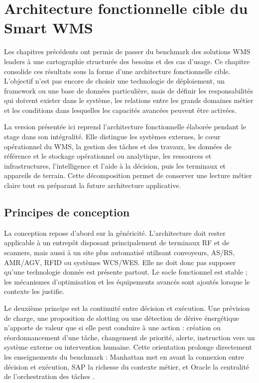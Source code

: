 \chapter{Architecture fonctionnelle cible du Smart WMS}

\label{chap:4}

Les chapitres précédents ont permis de passer du benchmark des solutions WMS leaders à une cartographie structurée des besoins et des cas d’usage. Ce chapitre consolide ces résultats sous la forme d’une architecture fonctionnelle cible. L’objectif n’est pas encore de choisir une technologie de déploiement, un framework ou une base de données particulière, mais de définir les responsabilités qui doivent exister dans le système, les relations entre les grands domaines métier et les conditions dans lesquelles les capacités avancées peuvent être activées.


La version présentée ici reprend l’architecture fonctionnelle élaborée pendant le stage dans son intégralité. Elle distingue les systèmes externes, le cœur opérationnel du WMS, la gestion des tâches et des travaux, les données de référence et le stockage opérationnel ou analytique, les ressources et infrastructures, l’intelligence et l’aide à la décision, puis les terminaux et appareils de terrain. Cette décomposition permet de conserver une lecture métier claire tout en préparant la future architecture applicative.



\section{Principes de conception}

\label{sec:4.1}

La conception repose d’abord sur la généricité. L’architecture doit rester applicable à un entrepôt disposant principalement de terminaux RF et de scanners, mais aussi à un site plus automatisé utilisant convoyeurs, AS/RS, AMR/AGV, RFID ou systèmes WCS/WES. Elle ne doit donc pas supposer qu’une technologie donnée est présente partout. Le socle fonctionnel est stable ; les mécanismes d’optimisation et les équipements avancés sont ajoutés lorsque le contexte les justifie.


Le deuxième principe est la continuité entre décision et exécution. Une prévision de charge, une proposition de slotting ou une détection de dérive énergétique n’apporte de valeur que si elle peut conduire à une action : création ou réordonnancement d’une tâche, changement de priorité, alerte, instruction vers un système externe ou intervention humaine. Cette orientation prolonge directement les enseignements du benchmark : Manhattan met en avant la connexion entre décision et exécution, SAP la richesse du contexte métier, et Oracle la centralité de l’orchestration des tâches \cite{ref4,ref5,ref6,ref7,ref8,ref9,ref10}.


